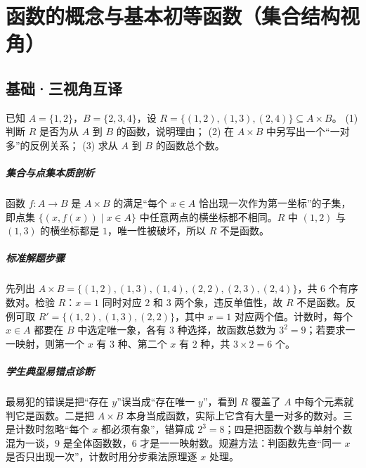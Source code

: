 \chapter{函数的概念与基本初等函数（集合结构视角）}

\section{基础·三视角互译}

\begin{problem}
已知 $A=\{1,2\}$，$B=\{2,3,4\}$，设 $R=\{(1,2),(1,3),(2,4)\}\subseteq A\times B$。
(1) 判断 $R$ 是否为从 $A$ 到 $B$ 的函数，说明理由；
(2) 在 $A\times B$ 中另写出一个“一对多”的反例关系；
(3) 求从 $A$ 到 $B$ 的函数总个数。
\end{problem}
\begin{solution}
\paragraph{集合与点集本质剖析}
函数 $f:A\to B$ 是 $A\times B$ 的满足“每个 $x\in A$ 恰出现一次作为第一坐标”的子集，即点集 $\{(x,f(x))\mid x\in A\}$ 中任意两点的横坐标都不相同。$R$ 中 $(1,2)$ 与 $(1,3)$ 的横坐标都是 $1$，唯一性被破坏，所以 $R$ 不是函数。
\paragraph{标准解题步骤}
先列出 $A\times B=\{(1,2),(1,3),(1,4),(2,2),(2,3),(2,4)\}$，共 $6$ 个有序数对。检验 $R$：$x=1$ 同时对应 $2$ 和 $3$ 两个象，违反单值性，故 $R$ 不是函数。反例可取 $R'=\{(1,2),(1,3),(2,2)\}$，其中 $x=1$ 对应两个值。计数时，每个 $x\in A$ 都要在 $B$ 中选定唯一象，各有 $3$ 种选择，故函数总数为 $3^2=9$；若要求一一映射，则第一个 $x$ 有 $3$ 种、第二个 $x$ 有 $2$ 种，共 $3\times2=6$ 个。
\paragraph{学生典型易错点诊断}
最易犯的错误是把“存在 $y$”误当成“存在唯一 $y$”，看到 $R$ 覆盖了 $A$ 中每个元素就判它是函数。二是把 $A\times B$ 本身当成函数，实际上它含有大量一对多的数对。三是计数时忽略“每个 $x$ 都必须有象”，错算成 $2^3=8$；四是把函数个数与单射个数混为一谈，$9$ 是全体函数数，$6$ 才是一一映射数。规避方法：判函数先查“同一 $x$ 是否只出现一次”，计数时用分步乘法原理逐 $x$ 处理。
\end{solution}


